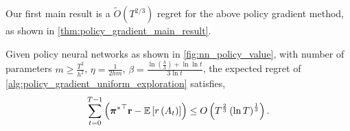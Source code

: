 Our first main result is a $\tilde{O}(T^{2/3})$ regret for the above policy gradient method, as shown in \cref{thm:policy_gradient_main_result}.
\begin{thm}
	\label{thm:policy_gradient_main_result}
	Given policy neural networks as shown in \cref{fig:nn_policy_value}, with number of parameters $m \ge \frac{T^2}{h^2}$, $\eta = \frac{1}{2 h m}$, $\beta = \frac{ \ln{\left(\frac{h}{3}\right) + \ln{\ln{t}} } }{ 3 \ln{t}}$, the expected regret of \cref{alg:policy_gradient_uniform_exploration} satisfies,
	\begin{equation*}
	\begin{split}
	\sum\limits_{t=0}^{T-1}{ \left( {{\boldsymbol{\pi}}^*}^\top {\mathbf{r}} - {\mathbb{E}} \left[ r\left(A_t\right) \right] \right)} \le O\left(T^{\frac{2}{3}}\left( \ln{T} \right)^{\frac{1}{3}}\right).
	\end{split}
	\end{equation*}
\end{thm}

